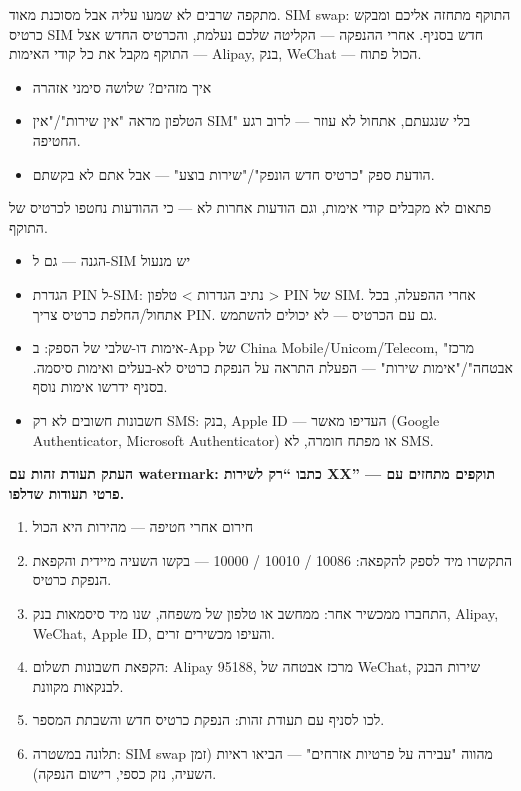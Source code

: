 \begin{tcbinfo}{מתקפה שרבים לא שמעו עליה אבל מסוכנת מאוד. SIM swap: התוקף מתחזה אליכם ומבקש כרטיס SIM חדש בסניף. אחרי ההנפקה — הקליטה שלכם נעלמת, והכרטיס החדש אצל התוקף מקבל את כל קודי האימות — Alipay, בנק, WeChat — הכול פתוח.}
\begin{itemize}
  \item איך מזהים? שלושה סימני אזהרה
  \item הטלפון מראה "אין שירות"/"אין SIM" בלי שנגעתם, אתחול לא עוזר — לרוב רגע החטיפה.
  \item הודעת ספק "כרטיס חדש הונפק"/"שירות בוצע" — אבל אתם לא בקשתם.
\end{itemize}

\end{tcbinfo}

\begin{tcbwarn}{פתאום לא מקבלים קודי אימות, וגם הודעות אחרות לא — כי ההודעות נחטפו לכרטיס של התוקף.}
\begin{itemize}
  \item הגנה — גם ל-SIM יש מנעול
  \item הגדרת PIN ל-SIM: נתיב הגדרות > טלפון > PIN של SIM. אחרי ההפעלה, בכל אתחול/החלפת כרטיס צריך PIN. גם עם הכרטיס — לא יכולים להשתמש.
  \item אימות דו-שלבי של הספק: ב-App של China Mobile/Unicom/Telecom, "מרכז אבטחה"/"אימות שירות" — הפעלת התראה על הנפקת כרטיס לא-בעלים ואימות סיסמה. בסניף ידרשו אימות נוסף.
  \item חשבונות חשובים לא רק SMS: בנק, Apple ID — העדיפו מאשר (Google Authenticator, Microsoft Authenticator) או מפתח חומרה, לא SMS.
\end{itemize}

\end{tcbwarn}

\textbf{העתק תעודת זהות עם watermark: כתבו “רק לשירות XX” — תוקפים מתחזים עם פרטי תעודות שדלפו.}\par

\begin{enumerate}
  \item חירום אחרי חטיפה — מהירות היא הכול
  \item התקשרו מיד לספק להקפאה: 10086 / 10010 / 10000 — בקשו השעיה מיידית והקפאת הנפקת כרטיס.
  \item התחברו ממכשיר אחר: ממחשב או טלפון של משפחה, שנו מיד סיסמאות בנק, Alipay, WeChat, Apple ID, והעיפו מכשירים זרים.
  \item הקפאת חשבונות תשלום: Alipay 95188, מרכז אבטחה של WeChat, שירות הבנק לבנקאות מקוונת.
  \item לכו לסניף עם תעודת זהות: הנפקת כרטיס חדש והשבתת המספר.
  \item תלונה במשטרה: SIM swap מהווה "עבירה על פרטיות אזרחים" — הביאו ראיות (זמן השעיה, נזק כספי, רישום הנפקה).
\end{enumerate}

